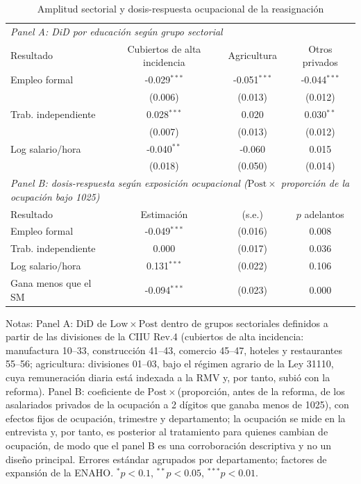 \begin{table}[!tbp]\centering
\caption{Amplitud sectorial y dosis-respuesta ocupacional de la reasignación}\label{tab:sectorocc}
\begin{threeparttable}
\footnotesize
\begin{tabular}{lccc}
\toprule
\multicolumn{4}{l}{\emph{Panel A: DiD por educación según grupo sectorial}} \\
Resultado & Cubiertos de alta incidencia & Agricultura & Otros privados \\
\midrule
Empleo formal & -0.029$^{***}$ & -0.051$^{***}$ & -0.044$^{***}$ \\
 & (0.006) & (0.013) & (0.012) \\
Trab. independiente & 0.028$^{***}$ & 0.020 & 0.030$^{**}$ \\
 & (0.007) & (0.013) & (0.012) \\
Log salario/hora & -0.040$^{**}$ & -0.060 & 0.015 \\
 & (0.018) & (0.050) & (0.014) \\
\midrule
\multicolumn{4}{l}{\emph{Panel B: dosis-respuesta según exposición ocupacional ($\mathrm{Post}\times$ proporción de la ocupación bajo 1025)}} \\
Resultado & Estimación & (s.e.) & $p$ adelantos \\ \midrule
Empleo formal & -0.049$^{***}$ & (0.016) & 0.008 \\
Trab. independiente & 0.000 & (0.017) & 0.036 \\
Log salario/hora & 0.131$^{***}$ & (0.022) & 0.106 \\
Gana menos que el SM & -0.094$^{***}$ & (0.023) & 0.000 \\
\bottomrule
\end{tabular}
\begin{tablenotes}\footnotesize
\item Notas: Panel A: DiD de $\mathrm{Low}\times\mathrm{Post}$ dentro de grupos sectoriales definidos a partir de las divisiones de la CIIU Rev.4 (cubiertos de alta incidencia: manufactura 10--33, construcción 41--43, comercio 45--47, hoteles y restaurantes 55--56; agricultura: divisiones 01--03, bajo el régimen agrario de la Ley 31110, cuya remuneración diaria está indexada a la RMV y, por tanto, subió con la reforma). Panel B: coeficiente de $\mathrm{Post}\times$(proporción, antes de la reforma, de los asalariados privados de la ocupación a 2 dígitos que ganaba menos de 1025), con efectos fijos de ocupación, trimestre y departamento; la ocupación se mide en la entrevista y, por tanto, es posterior al tratamiento para quienes cambian de ocupación, de modo que el panel B es una corroboración descriptiva y no un diseño principal. Errores estándar agrupados por departamento; factores de expansión de la ENAHO. $^{*}p<0.1$, $^{**}p<0.05$, $^{***}p<0.01$.
\end{tablenotes}
\end{threeparttable}\end{table}

